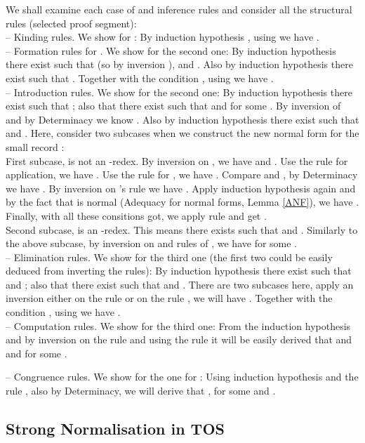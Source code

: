 \documentclass[submission,copyright,creativecommons]{eptcs}
\newcommand{\selfcomment}[1]{\ifodd 0 {\sf #1 }\fi}
\newcommand{\selfc}{\selfcomment}
\newcommand{\qed}{}
\begin{document}
\selfc{
We shall examine each case of  and  inference rules
and consider all the structural rules (selected proof segment): \\
-- Kinding rules. We show for : By induction hypothesis , using  we have . \\
-- Formation rules for . We show for the second one: By induction hypothesis there exist  such that  (so by inversion ), and . Also by induction hypothesis there exist  such that . Together with the condition , using  we have . \\
-- Introduction rules. We show for the second one: By induction hypothesis there exist  such that  ; also that there exist  such that  and  for some . By inversion of  and by Determinacy we know . Also by induction hypothesis there exist  such that  and  . Here, consider two subcases when we construct the new normal form for the small record : \\
\indent
First subcase,  is not an -redex. By inversion on , we have  and . Use the  rule for application, we have . Use the  rule for , we have  . Compare  and , by Determinacy we have . By inversion on 's  rule we have . Apply induction hypothesis again and by the fact that  is normal (Adequacy for normal forms, Lemma \ref{ANF}), we have . Finally, with all these consitions got, we apply  rule and get . \\
\indent
Second subcase,  is an -redex. This means there exists  such that  and . Similarly to the above subcase, by inversion on  and  rules of , we have  for some . \\
-- Elimination rules. We show for the third one (the first two could be easily deduced from inverting the  rules): By induction hypothesis there exist  such that  and ; also that there exist  such that  and . There are two subcases here, apply an inversion either on the rule  or on the rule , we will have . Together with the condition , using  we have . \\
-- Computation rules. We show for the third one: From the induction hypothesis and by inversion on the rule  and using the rule  it will be easily derived that  and  and  for some . 


-- Congruence rules. We show for the one for : Using induction hypothesis and the rule , also by Determinacy, we will derive that ,  for some  and .
\qed \\


}



\subsection{Strong Normalisation in TOS}
\label{sec:PSR-SN}
\end{document}
